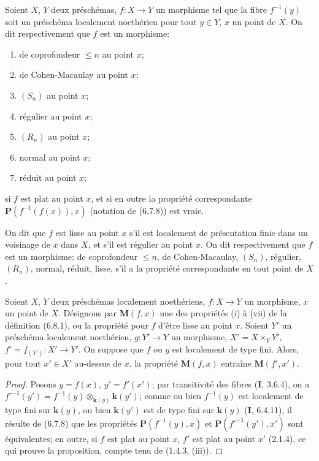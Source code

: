 \begin{definition}[6.8.1]
\label{IV.2.s6.8.1-fr}
Soient $X$, $Y$ deux préschémas, $f:X\to Y$ un morphisme tel que la fibre
$f^{-1}(y)$ soit un préschéma localement noethérien pour tout $y\in Y$, $x$
un point de $X$. On dit respectivement que $f$ est un morphisme:
\begin{enumerate}
\item[\textup{(i)}] de coprofondeur $\leq n$ au point $x$;
\item[\textup{(ii)}] de Cohen-Macaulay au point $x$;
\item[\textup{(iii)}] $(S_n)$ au point $x$;
\item[\textup{(iv)}] régulier au point $x$;
\item[\textup{(v)}] $(R_n)$ au point $x$;
\item[\textup{(vi)}] normal au point $x$;
\item[\textup{(vii)}] réduit au point $x$;
\end{enumerate}
si $f$ est plat au point $x$, et si en outre la propriété correspondante
$\boldsymbol{P}(f^{-1}(f(x)),x)$ (notation de \textup{(6.7.8)}) est vraie.

On dit que $f$ est lisse au point $x$ s'il est localement de présentation finie
dans un voisinage de $x$ dans $X$, et s'il est régulier au point $x$. On dit
respectivement que $f$ est un morphisme: de coprofondeur $\leq n$, de
Cohen-Macaulay, $(S_n)$, régulier, $(R_n)$, normal, réduit, lisse, s'il a la
propriété correspondante en tout point de $X$.
\end{definition}

\begin{proposition}[6.8.2]
\label{IV.2.s6.8.2-fr}
Soient $X$, $Y$ deux préschémas localement noethériens, $f:X\to Y$ un
morphisme, $x$ un point de $X$. Désignons par $\boldsymbol{M}(f,x)$ une des propriétés
\textup{(i)} à \textup{(vii)} de la définition \textup{(6.8.1)}, ou la propriété pour $f$ d'être lisse au
point $x$. Soient $Y'$ un préschéma localement noethérien, $g:Y'\to Y$ un
morphisme, $X'=X\times_Y Y'$, $f'=f_{(Y')}:X'\to Y'$. On suppose que $f$
ou $g$ est localement de type fini. Alors, pour tout $x'\in X'$ au-dessus de
$x$, la propriété $\boldsymbol{M}(f,x)$ entraîne $\boldsymbol{M}(f',x')$.
\end{proposition}

\begin{proof}
Posons $y=f(x)$, $y'=f'(x')$; par transitivité des fibres (\textbf{I}, 3.6.4), on a
$f'^{-1}(y')=f^{-1}(y)\otimes_{\mathbf{k}(y)}\boldsymbol{k}(y')$; comme ou bien $f^{-1}(y)$ est localement de type fini sur $\boldsymbol{k}(y)$, ou bien
$\boldsymbol{k}(y')$ est de type fini sur $\boldsymbol{k}(y)$ (\textbf{I}, 6.4.11), il résulte de (6.7.8) que
les propriétés $\boldsymbol{P}(f^{-1}(y),x)$ et $\boldsymbol{P}(f'^{-1}(y'),x')$ sont équivalentes; en
outre, si $f$ est plat au point $x$, $f'$ est plat au point $x'$ (2.1.4), ce
qui prouve la proposition, compte tenu de (1.4.3, (iii)).
\end{proof}

